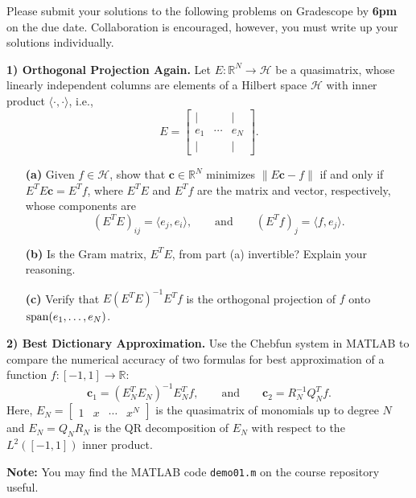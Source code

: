 \documentclass[12pt]{article}
\begin{document}
\noindent
Please submit your solutions to the following problems on Gradescope by \textbf{6pm} on the due date. Collaboration is encouraged, however, you must write up your solutions individually.

\bigskip

\noindent
\textbf{1) Orthogonal Projection Again.} Let $E:\mathbb{R}^N\rightarrow \mathcal{H}$ be a quasimatrix, whose linearly independent columns are elements of a Hilbert space $\mathcal{H}$ with inner product $\langle\cdot,\cdot\rangle$, i.e.,
$$
E = \begin{bmatrix}
| & & | \\
e_1 & \cdots & e_N \\
| & & |
\end{bmatrix}.
$$

\begin{itemize}

	\item[\textbf{(a)}] Given $f\in\mathcal{H}$, show that $\mathbf{c}\in\mathbb{R}^N$ minimizes $\|E\mathbf{c}-f\|$ if and only if $E^TE\mathbf{c}=E^Tf$, where $E^TE$ and  $E^Tf$ are the matrix and vector, respectively, whose components are
$$
(E^TE)_{ij} = \langle e_j, e_i\rangle, \qquad\text{and}\qquad (E^Tf)_j = \langle f, e_j\rangle.
$$

	\item[\textbf{(b)}] Is the Gram matrix, $E^TE$, from part (a) invertible? Explain your reasoning.

	\item[\textbf{(c)}] Verify that $E(E^TE)^{-1}E^Tf$ is the orthogonal projection of $f$ onto ${\rm span}(e_1,\ldots,e_N)$.

\end{itemize}

\bigskip

\noindent
\textbf{2) Best Dictionary Approximation.} Use the Chebfun system in MATLAB to compare the numerical accuracy of two formulas for best approximation of a function $f:[-1,1]\rightarrow\mathbb{R}$:
$$
\mathbf{c}_1 = (E_N^TE_N)^{-1}E_N^Tf, \qquad\text{and}\qquad \mathbf{c}_2 = R_N^{-1} Q_N^Tf.
$$
Here, $E_N = \begin{bmatrix} 1 & x & \cdots & x^N\end{bmatrix}$ is the quasimatrix of monomials up to degree $N$ and $E_N = Q_NR_N$ is the QR decomposition of $E_N$ with respect to the $L^2([-1,1])$ inner product.

\medskip
\noindent
\textbf{Note:} You may find the MATLAB code \texttt{demo01.m} on the course repository useful.
\end{document}
